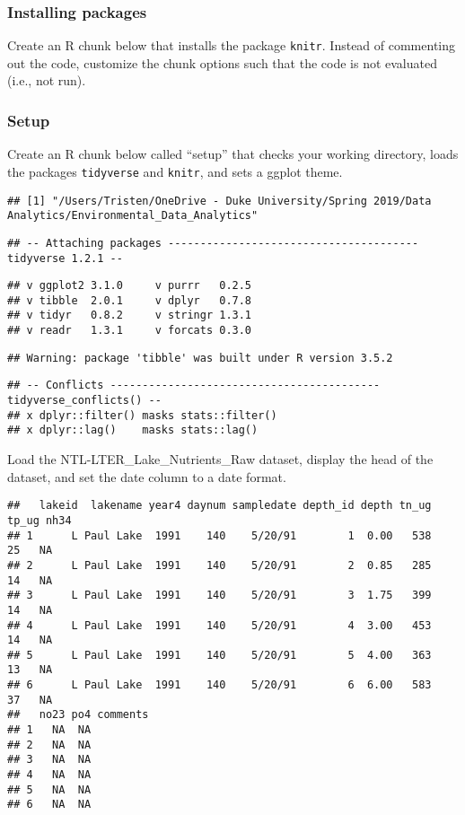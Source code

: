 \documentclass[]{article}
\begin{document}
\subsubsection{Installing packages}\label{installing-packages}

Create an R chunk below that installs the package \texttt{knitr}.
Instead of commenting out the code, customize the chunk options such
that the code is not evaluated (i.e., not run).

\subsubsection{Setup}\label{setup}

Create an R chunk below called ``setup'' that checks your working
directory, loads the packages \texttt{tidyverse} and \texttt{knitr}, and
sets a ggplot theme.

\begin{verbatim}
## [1] "/Users/Tristen/OneDrive - Duke University/Spring 2019/Data Analytics/Environmental_Data_Analytics"
\end{verbatim}

\begin{verbatim}
## -- Attaching packages --------------------------------------- tidyverse 1.2.1 --
\end{verbatim}

\begin{verbatim}
## v ggplot2 3.1.0     v purrr   0.2.5
## v tibble  2.0.1     v dplyr   0.7.8
## v tidyr   0.8.2     v stringr 1.3.1
## v readr   1.3.1     v forcats 0.3.0
\end{verbatim}

\begin{verbatim}
## Warning: package 'tibble' was built under R version 3.5.2
\end{verbatim}

\begin{verbatim}
## -- Conflicts ------------------------------------------ tidyverse_conflicts() --
## x dplyr::filter() masks stats::filter()
## x dplyr::lag()    masks stats::lag()
\end{verbatim}

Load the NTL-LTER\_Lake\_Nutrients\_Raw dataset, display the head of the
dataset, and set the date column to a date format.

\begin{verbatim}
##   lakeid  lakename year4 daynum sampledate depth_id depth tn_ug tp_ug nh34
## 1      L Paul Lake  1991    140    5/20/91        1  0.00   538    25   NA
## 2      L Paul Lake  1991    140    5/20/91        2  0.85   285    14   NA
## 3      L Paul Lake  1991    140    5/20/91        3  1.75   399    14   NA
## 4      L Paul Lake  1991    140    5/20/91        4  3.00   453    14   NA
## 5      L Paul Lake  1991    140    5/20/91        5  4.00   363    13   NA
## 6      L Paul Lake  1991    140    5/20/91        6  6.00   583    37   NA
##   no23 po4 comments
## 1   NA  NA         
## 2   NA  NA         
## 3   NA  NA         
## 4   NA  NA         
## 5   NA  NA         
## 6   NA  NA
\end{verbatim}
\end{document}
